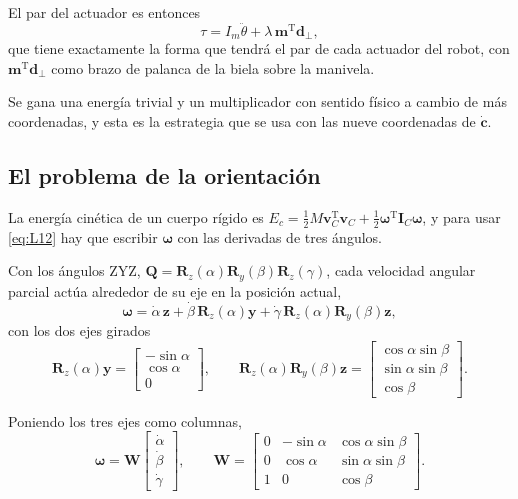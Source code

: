 \documentclass[11pt]{article}
\newcommand{\T}{^{\mathrm{T}}}
\newcommand{\wv}{\boldsymbol{\omega}}
\newcommand{\cd}{\dot{\mathbf{c}}}
\begin{document}
El par del actuador es entonces
\begin{equation}
\tau=I_m\ddot\theta+\lambda\,\mathbf{m}\T\mathbf{d}_{\perp},
\label{eq:R7}
\end{equation}
que tiene exactamente la forma que tendrá el par de cada actuador del robot, con $\mathbf{m}\T\mathbf{d}_{\perp}$ como brazo de palanca de la biela sobre la manivela.

Se gana una energía trivial y un multiplicador con sentido físico a cambio de más coordenadas, y esta es la estrategia que se usa con las nueve coordenadas de $\cd$.

\subsection{El problema de la orientación}

La energía cinética de un cuerpo rígido es $E_c=\tfrac12M\mathbf{v}_C\T\mathbf{v}_C+\tfrac12\wv\T\mathbf{I}_C\wv$, y para usar \eqref{eq:L12} hay que escribir $\wv$ con las derivadas de tres ángulos.

Con los ángulos ZYZ, $\mathbf{Q}=\mathbf{R}_z(\alpha)\mathbf{R}_y(\beta)\mathbf{R}_z(\gamma)$, cada velocidad angular parcial actúa alrededor de su eje en la posición actual,
\begin{equation}
\wv=\dot\alpha\,\mathbf{z}+\dot\beta\,\mathbf{R}_z(\alpha)\mathbf{y}+\dot\gamma\,\mathbf{R}_z(\alpha)\mathbf{R}_y(\beta)\mathbf{z},
\label{eq:O1}
\end{equation}
con los dos ejes girados
\begin{equation}
\mathbf{R}_z(\alpha)\mathbf{y}=\begin{bmatrix}-\sin\alpha\\ \cos\alpha\\ 0\end{bmatrix},
\qquad
\mathbf{R}_z(\alpha)\mathbf{R}_y(\beta)\mathbf{z}=\begin{bmatrix}\cos\alpha\sin\beta\\ \sin\alpha\sin\beta\\ \cos\beta\end{bmatrix}.
\label{eq:O2}
\end{equation}

Poniendo los tres ejes como columnas,
\begin{equation}
\wv=\mathbf{W}\begin{bmatrix}\dot\alpha\\ \dot\beta\\ \dot\gamma\end{bmatrix},
\qquad
\mathbf{W}=\begin{bmatrix}0 & -\sin\alpha & \cos\alpha\sin\beta\\ 0 & \cos\alpha & \sin\alpha\sin\beta\\ 1 & 0 & \cos\beta\end{bmatrix}.
\label{eq:O3}
\end{equation}
\end{document}
